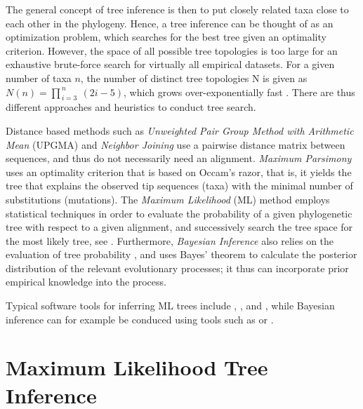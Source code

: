 The general concept of tree inference is then to put closely related taxa close to each other in the phylogeny.
Hence, a tree inference can be thought of as an optimization problem,
which searches for the best tree given an optimality criterion.
However, the space of all possible tree topologies is too large for an exhaustive brute-force search
for virtually all empirical datasets.
For a given number of taxa $n$, the number of distinct tree topologies N is given as
$N(n) = \prod_{\,i=3}^{\,n} ~(2i - 5)$,
which grows over-exponentially fast \cite{Felsenstein2004}.
There are thus different approaches and heuristics to conduct tree search.

Distance based methods such as \emph{Unweighted Pair Group Method with Arithmetic Mean} (UPGMA) \cite{Sokal1958}
and \emph{Neighbor Joining} \cite{Saitou1987}
use a pairwise distance matrix between sequences, and thus do not necessarily need an alignment.
\emph{Maximum Parsimony} \cite{Sankoff1975} uses an optimality criterion that is based on Occam's razor,
that is, it yields the tree that explains the observed tip sequences (taxa)
with the minimal number of substitutions (mutations).
The \emph{Maximum Likelihood} (ML) method \cite{Felsenstein1981} employs statistical techniques
in order to evaluate the probability of a given phylogenetic tree with respect to a given alignment,
and successively search the tree space for the most likely tree, see .
Furthermore, \emph{Bayesian Inference} also relies on the evaluation of tree probability \cite{Yang2006},
and uses Bayes' theorem to calculate the posterior distribution of the relevant evolutionary processes;
it thus can incorporate prior empirical knowledge into the process.

Typical software tools for inferring ML trees include  \cite{Nguyen2015a},
 \cite{Price2010}, and  \cite{Stamatakis2014},
while Bayesian inference can for example be conduced using tools such as  \cite{Suchard2018}
or  \cite{Ronquist2003}.


\section{Maximum Likelihood Tree Inference}
\label{ch:Foundations:sec:MLTreeInference}

